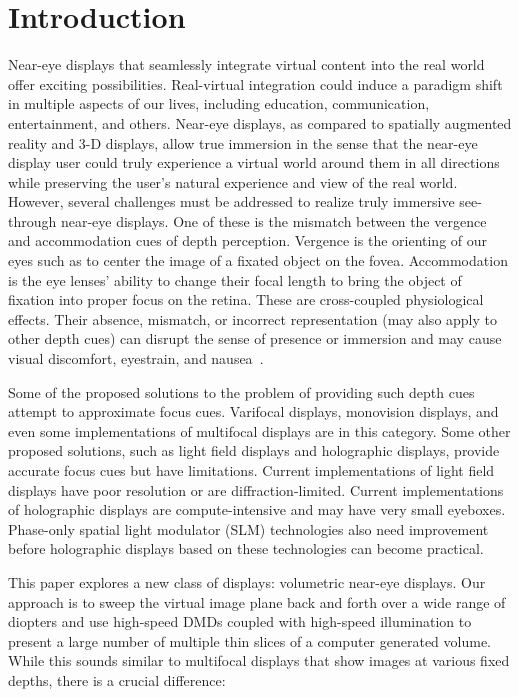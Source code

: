 \section{Introduction}
\label{sec:volumetric:introduction}
Near-eye displays that seamlessly integrate virtual content into the real world offer exciting possibilities. Real-virtual integration could induce a paradigm shift in multiple aspects of our lives, including education, communication, entertainment, and others. Near-eye displays, as compared to spatially augmented reality and 3-D displays, allow true immersion in the sense that the near-eye display user could truly experience a virtual world around them in all directions while preserving the user's natural experience and view of the real world. However, several challenges must be addressed to realize truly immersive see-through near-eye displays. One of these is the mismatch between the vergence and accommodation cues of depth perception. Vergence is the orienting of our eyes such as to center the image of a fixated object on the fovea. Accommodation is the eye lenses' ability to change their focal length to bring the object of fixation into proper focus on the retina. These are cross-coupled physiological effects. Their absence, mismatch, or incorrect representation (may also apply to other depth cues) can disrupt the sense of presence or immersion and may cause visual discomfort, eyestrain, and nausea~\cite{Hoffman2008Vergence}. 

Some of the proposed solutions to the problem of providing such depth cues attempt to approximate focus cues. Varifocal displays, monovision displays, and even some implementations of multifocal displays are in this category. Some other proposed solutions, such as light field displays and holographic displays, provide accurate focus cues but have limitations. Current implementations of light field displays have poor resolution or are diffraction-limited. Current implementations of holographic displays are compute-intensive and may have very small eyeboxes. Phase-only spatial light modulator (SLM) technologies also need improvement before holographic displays based on these technologies can become practical.

This paper explores a new class of displays: volumetric near-eye displays. Our approach is to sweep the virtual image plane back and forth over a wide range of diopters and use high-speed DMDs coupled with high-speed illumination to present a large number of multiple thin slices of a computer generated volume. While this sounds similar to multifocal displays that show images at various fixed depths, there is a crucial difference:

